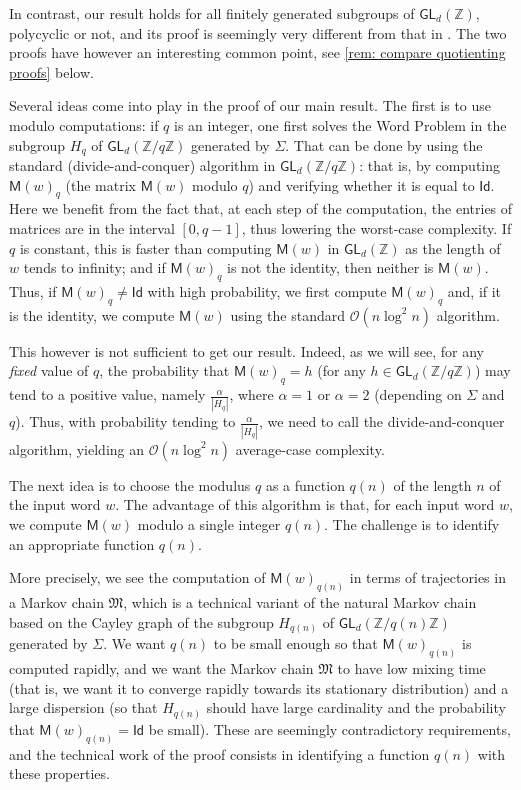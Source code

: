 \documentclass{article}
\def\Id{\textsf{Id}}
\def\O{\mathcal{O}}
\def\tM{\mathfrak{M}}
\def\Z{\mathbb{Z}}
\def\GL{\textsf{GL}}
\def\mat{\textsf{M}}
\theoremstyle{plain}
\theoremstyle{definition}
\begin{document}
In contrast, our result holds for all finitely generated subgroups of $\GL_d(\Z)$, polycyclic or not, and its proof is seemingly very different from that in \cite{2025:OlshShp}. The two proofs have however an interesting common point, see \cref{rem: compare quotienting proofs} below.

Several ideas come into play in the proof of our main result. The first is to use modulo computations: if $q$ is an integer, one first solves the Word Problem in the subgroup $H_q$ of $\GL_d(\Z/q\Z)$ generated by $\Sigma$. That can be done by using the standard (divide-and-conquer) algorithm in $\GL_d(\Z/q\Z)$: that is, by computing $\mat(w)_q$ (the matrix $\mat(w)$ modulo $q$) and verifying whether it is equal to $\Id$. Here we benefit from the fact that, at each step of the computation, the entries of matrices are in the interval $[0, q-1]$, thus lowering the worst-case complexity. If $q$ is constant, this is faster than computing $\mat(w)$ in $\GL_d(\Z)$ as the length of $w$ tends to infinity; and if $\mat(w)_q$ is not the identity, then neither is $\mat(w)$. Thus, if $\mat(w)_q \ne \Id$ with high probability, we first compute $\mat(w)_q$ and, if it is the identity, we compute $\mat(w)$ using the standard $\O(n\log^2 n)$ algorithm.

This however is not sufficient to get our result.
%
Indeed, as we will see, for any \emph{fixed} value of $q$, the probability that $\mat(w)_q = h$ (for any $h \in \GL_d(\Z/q\Z)$) may tend to a positive value, namely $\frac\alpha{|H_q|}$, where $\alpha = 1$ or $\alpha = 2$ (depending on $\Sigma$ and $q$). Thus, with probability tending to $\frac\alpha{|H_q|}$, we need to call the divide-and-conquer algorithm, yielding an $\O(n\log^2n)$ average-case complexity.

The next idea is to choose the modulus $q$ as a function $q(n)$ of the length $n$ of the input word $w$. The advantage of this algorithm is that, for each input word $w$, we compute $\mat(w)$ modulo a single integer $q(n)$. The challenge is to identify an appropriate function $q(n)$.

More precisely, we see the computation of $\mat(w)_{q(n)}$ in terms of trajectories in a Markov chain $\tM$, which is a technical variant of the natural Markov chain based on the Cayley graph of the subgroup $H_{q(n)}$ of $\GL_d(\Z/q(n)\Z)$ generated by $\Sigma$. We want $q(n)$ to be small enough so that $\mat(w)_{q(n)}$ is computed rapidly, and we want the Markov chain $\tM$ to have low mixing time (that is, we want it to converge rapidly towards its stationary distribution) and a large dispersion (so that $H_{q(n)}$ should have large cardinality and the probability that $\mat(w)_{q(n)} = \Id$ be small). These are seemingly contradictory requirements, and the technical work of the proof consists in identifying a function $q(n)$ with these properties.
\end{document}
